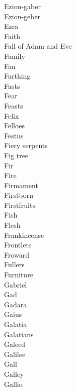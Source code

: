 Ezion-gaber  \\
Ezion-geber  \\
Ezra  \\
Faith  \\
Fall of Adam and Eve  \\
Family  \\
Fan  \\
Farthing  \\
Fasts  \\
Fear  \\
Feasts  \\
Felix  \\
Felloes  \\
Festus  \\
Fiery serpents  \\
Fig tree  \\
Fir  \\
Fire  \\
Firmament  \\
Firstborn  \\
Firstfruits  \\
Fish  \\
Flesh  \\
Frankincense  \\
Frontlets  \\
Froward  \\
Fullers  \\
Furniture  \\
Gabriel  \\
Gad  \\
Gadara  \\
Gaius  \\
Galatia  \\
Galatians  \\
Galeed  \\
Galilee  \\
Gall  \\
Galley  \\
Gallio  \\
